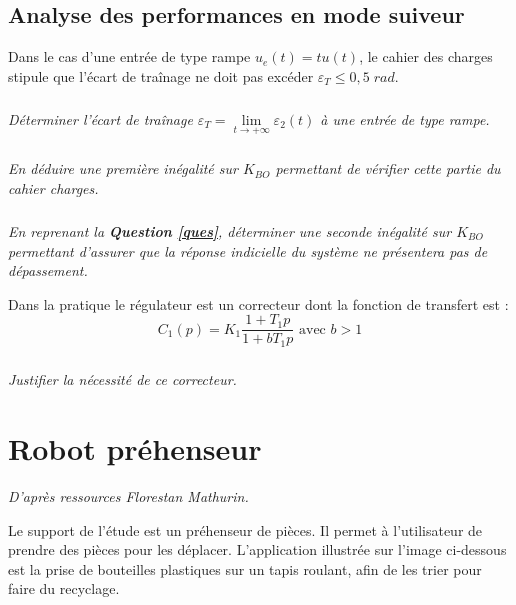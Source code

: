 \documentclass[10pt,fleqn]{article} %
\begin{document}
\begin{multicols}{2}
\subsection*{Analyse des performances en mode suiveur}
Dans le cas d’une entrée de type rampe $u_e(t) = t u(t)$, le cahier des charges stipule que l’écart de
traînage ne doit pas excéder $\varepsilon_T \leq 0,5\;rad$.

\subparagraph{}
\textit{Déterminer l’écart de traînage $\varepsilon_T =\lim\limits_{t\to +\infty} \varepsilon_2(t)$ à une entrée de type rampe.}

\subparagraph{}
\textit{En déduire une première inégalité sur $K_{BO}$ permettant de vérifier cette partie du cahier
charges.}

\subparagraph{}
\textit{En reprenant la \textbf{Question \ref{ques}}, déterminer une seconde inégalité sur $K_{BO}$ permettant d’assurer que la réponse indicielle du système ne présentera pas de dépassement.}

Dans la pratique le régulateur est un correcteur dont la fonction de transfert est :
$$
C_1(p)=K_1\dfrac{1+T_1 p}{1+bT_1 p} \text{ avec } b>1
$$


\subparagraph{}
\textit{Justifier la nécessité de ce correcteur.}

\newpage

\section*{Robot préhenseur}
\setcounter{exo}{0}

\begin{flushright}
\textit{D'après ressources Florestan Mathurin.}
\end{flushright}



Le support de l'étude est un préhenseur de pièces. Il permet à l'utilisateur de prendre des pièces pour les déplacer. L'application illustrée sur l'image ci-dessous est la prise de bouteilles plastiques sur un tapis roulant, afin de les trier pour faire du recyclage. 

\vspace{0.25cm}


\end{multicols}
\end{document}
